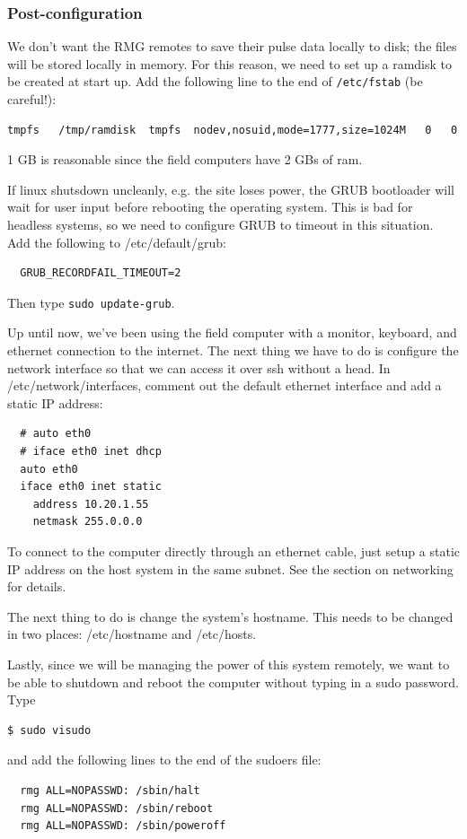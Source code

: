 \documentclass[letter]{article}
\begin{document}
\subsubsection{Post-configuration} 

We don't want the RMG remotes to save their pulse data locally to disk; the files will be stored
locally in memory. For this reason, we need to set up a ramdisk to be created at start up. Add 
the following line to the end of \texttt{/etc/fstab} (be careful!): 
\begin{verbatim}
tmpfs   /tmp/ramdisk  tmpfs  nodev,nosuid,mode=1777,size=1024M   0   0
\end{verbatim}
1 GB is reasonable since the field computers have 2 GBs of ram. 

If linux shutsdown uncleanly, e.g. the site loses power, the GRUB bootloader will wait for user 
input before rebooting the operating system. This is bad for headless systems, so we need to 
configure GRUB to timeout in this situation. Add the following to /etc/default/grub: 
\begin{verbatim}
  GRUB_RECORDFAIL_TIMEOUT=2
\end{verbatim}
Then type \texttt{sudo update-grub}. 

Up until now, we've been using the field computer with a monitor, keyboard, and ethernet connection
to the internet. The next thing we have to do is configure the network interface so that we can 
access it over ssh without a head. In /etc/network/interfaces, comment out the default 
ethernet interface and add a static IP address: 
\begin{verbatim}
  # auto eth0
  # iface eth0 inet dhcp
  auto eth0
  iface eth0 inet static
    address 10.20.1.55
    netmask 255.0.0.0
\end{verbatim}
To connect to the computer directly through an ethernet cable, just setup a static IP address on 
the host system in the same subnet. See the section on networking for details. 

The next thing to do is change the system's hostname. This needs to be changed in two places:
/etc/hostname and /etc/hosts. 

Lastly, since we will be managing the power of this system remotely, we want to be able to 
shutdown and reboot the computer without typing in a sudo password. Type 
\begin{verbatim}
$ sudo visudo
\end{verbatim}
and add the following lines to the end of the sudoers file: 
\begin{verbatim}
  rmg ALL=NOPASSWD: /sbin/halt
  rmg ALL=NOPASSWD: /sbin/reboot
  rmg ALL=NOPASSWD: /sbin/poweroff
\end{verbatim}
\end{document}

